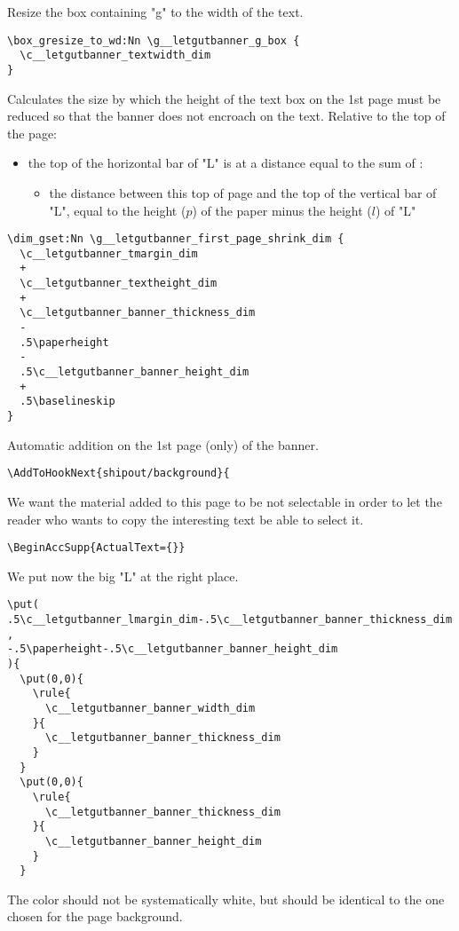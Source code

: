 \documentclass{letgut}
\begin{document}
Resize the box containing "g" to the width of the text.
\begin{lstlisting}
\box_gresize_to_wd:Nn \g__letgutbanner_g_box {
  \c__letgutbanner_textwidth_dim
}
\end{lstlisting}
Calculates the size by which the height of the text box on the 1st page must be
reduced so that the banner does not encroach on the text. Relative to the top of
the page:
\begin{itemize}
\item the top of the horizontal bar of "L" is at a distance equal to the sum of :
\begin{itemize}
\item the distance between this top of page and the top of the vertical bar of
"L", equal to the height (\(p\)) of the paper minus the height (\(l\)) of "L"
\end{itemize}
\end{itemize}
\begin{lstlisting}
\dim_gset:Nn \g__letgutbanner_first_page_shrink_dim {
  \c__letgutbanner_tmargin_dim
  +
  \c__letgutbanner_textheight_dim
  +
  \c__letgutbanner_banner_thickness_dim
  -
  .5\paperheight
  -
  .5\c__letgutbanner_banner_height_dim
  +
  .5\baselineskip
}
\end{lstlisting}
Automatic addition on the 1st page (only) of the banner.
\begin{lstlisting}
\AddToHookNext{shipout/background}{
\end{lstlisting}
We want the material added to this page to be not selectable in order to let the
reader who wants to copy the interesting text be able to select it.
\begin{lstlisting}
\BeginAccSupp{ActualText={}}
\end{lstlisting}
We put now the big "L" at the right place.
\begin{lstlisting}
\put(
.5\c__letgutbanner_lmargin_dim-.5\c__letgutbanner_banner_thickness_dim
,
-.5\paperheight-.5\c__letgutbanner_banner_height_dim
){
  \put(0,0){
    \rule{
      \c__letgutbanner_banner_width_dim
    }{
      \c__letgutbanner_banner_thickness_dim
    }
  }
  \put(0,0){
    \rule{
      \c__letgutbanner_banner_thickness_dim
    }{
      \c__letgutbanner_banner_height_dim
    }
  }
\end{lstlisting}
The color should not be systematically white, but should be identical to the one
chosen for the page background.
\end{document}
